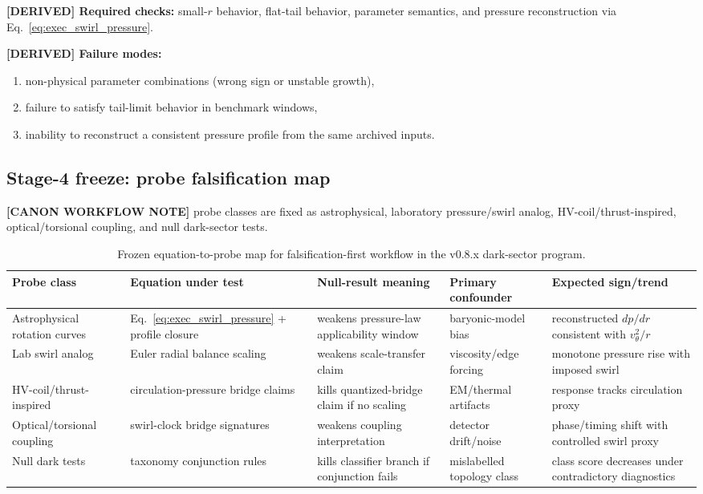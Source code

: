 \textbf{[DERIVED] Required checks:}
small-$r$ behavior, flat-tail behavior, parameter semantics, and pressure reconstruction via Eq.~\eqref{eq:exec_swirl_pressure}.

\textbf{[DERIVED] Failure modes:}
\begin{enumerate}
    \item non-physical parameter combinations (wrong sign or unstable growth),
    \item failure to satisfy tail-limit behavior in benchmark windows,
    \item inability to reconstruct a consistent pressure profile from the same archived inputs.
\end{enumerate}

\subsection{Stage-4 freeze: probe falsification map}
\textbf{[CANON WORKFLOW NOTE]} probe classes are fixed as astrophysical, laboratory pressure/swirl analog, HV-coil/thrust-inspired, optical/torsional coupling, and null dark-sector tests.

\begin{table}[h]
\centering
\begin{tabular}{p{2.7cm}p{3.1cm}p{2.5cm}p{2.2cm}p{2.2cm}}
\hline
Probe class & Equation under test & Null-result meaning & Primary confounder & Expected sign/trend \\
\hline
Astrophysical rotation curves & Eq.~\eqref{eq:exec_swirl_pressure} + profile closure & weakens pressure-law applicability window & baryonic-model bias & reconstructed $dp/dr$ consistent with $v_\theta^2/r$ \\
Lab swirl analog & Euler radial balance scaling & weakens scale-transfer claim & viscosity/edge forcing & monotone pressure rise with imposed swirl \\
HV-coil/thrust-inspired & circulation-pressure bridge claims & kills quantized-bridge claim if no scaling & EM/thermal artifacts & response tracks circulation proxy \\
Optical/torsional coupling & swirl-clock bridge signatures & weakens coupling interpretation & detector drift/noise & phase/timing shift with controlled swirl proxy \\
Null dark tests & taxonomy conjunction rules & kills classifier branch if conjunction fails & mislabelled topology class & class score decreases under contradictory diagnostics \\
\hline
\end{tabular}
\caption{Frozen equation-to-probe map for falsification-first workflow in the v0.8.x dark-sector program.}
\label{tab:exec-probe-map}
\end{table}

